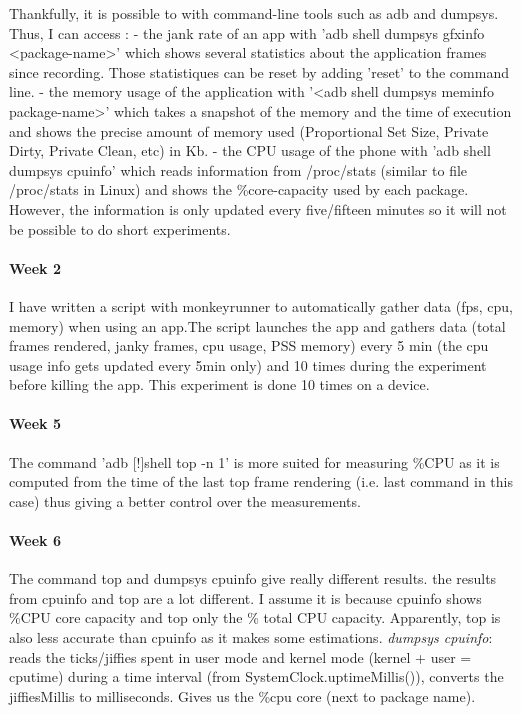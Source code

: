 \documentclass{kththesis}
\newcommand{\citationneeded}{\todo{Citation needed}[!]}
\begin{document}
    Thankfully, it is possible to with command-line tools such as adb and dumpsys. Thus, I can access : 
            - the jank rate of an app with 'adb shell dumpsys gfxinfo <package-name>' which shows several statistics about the application frames since recording. Those statistiques can be reset by adding 'reset' to the command line. 
            - the memory usage of the application with '<adb shell dumpsys meminfo package-name>' which takes a snapshot of the memory and the time of execution and shows the precise amount of memory used (Proportional Set Size, Private Dirty, Private Clean, etc) in Kb. 
            - the CPU usage of the phone with 'adb shell dumpsys cpuinfo' which reads information from /proc/stats (similar to file /proc/stats in Linux) and shows the \%core-capacity used by each package. However, the information is only updated every five/fifteen minutes so it will not be possible to do short experiments.
\paragraph{Week 2}

I have written a script with monkeyrunner to automatically gather data (fps, cpu, memory) when using an app.The script launches the app and gathers data (total frames rendered, janky frames, cpu usage, PSS memory) every 5 min (the cpu usage info gets updated every 5min only) and 10 times during the experiment before killing the app. This experiment is done 10 times on a device.

\paragraph{Week 5}
The command 'adb  \citationneeded shell top -n 1' is more suited for measuring \%CPU as it is computed from the time of the last top frame rendering (i.e. last command in this case) thus giving a better control over the measurements.

\paragraph{Week 6}
The command top and dumpsys cpuinfo give really different results.
the results from cpuinfo and top are a lot different. I assume it is because cpuinfo shows \%CPU core capacity and top only the \% total CPU capacity. Apparently, top is also less accurate than cpuinfo as it makes some estimations.
\textit{dumpsys cpuinfo}: reads the ticks/jiffies spent in user mode and kernel mode (kernel + user = cputime) during a time interval (from SystemClock.uptimeMillis()), converts the jiffiesMillis to milliseconds. Gives us the \%cpu core (next to package name).
\newline
\end{document}
